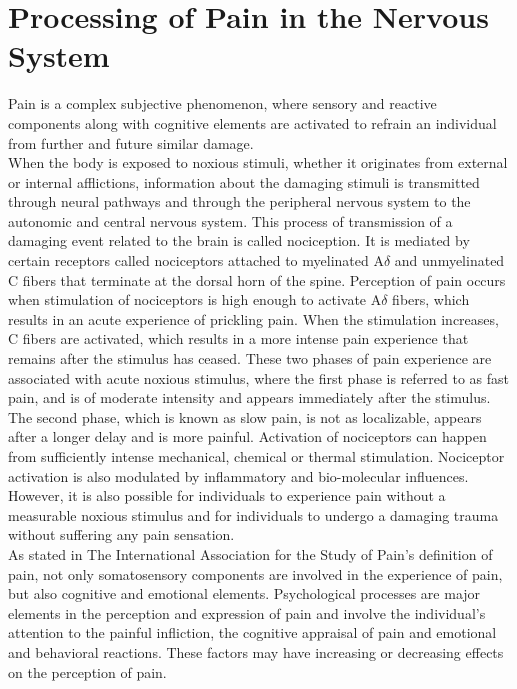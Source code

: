 \section{Processing of Pain in the Nervous System}

Pain is a complex subjective phenomenon, where sensory and reactive components along with cognitive elements are activated to refrain an individual from further and future similar damage. \\
When the body is exposed to noxious stimuli, whether it originates from external or internal afflictions, information about the damaging stimuli is transmitted through neural pathways and through the peripheral nervous system to the autonomic and central nervous system. This process of transmission of a damaging event related to the brain is called nociception. It is mediated by certain receptors called nociceptors attached to myelinated A$\delta$ and unmyelinated C fibers that terminate at the dorsal horn of the spine. Perception of pain occurs when stimulation of nociceptors is high enough to activate A$\delta$ fibers, which results in an acute experience of prickling pain. When the stimulation increases, C fibers are activated, which results in a more intense pain experience that remains after the stimulus has ceased. These two phases of pain experience are associated with acute noxious stimulus, where the first phase is referred to as fast pain, and is of moderate intensity and appears immediately after the stimulus. The second phase, which is known as slow pain, is not as localizable, appears after a longer delay and is more painful. Activation of nociceptors can happen from sufficiently intense mechanical, chemical or thermal stimulation. Nociceptor activation is also modulated by inflammatory and bio-molecular influences. However, it is also possible for individuals to experience pain without a measurable noxious stimulus and for individuals to undergo a damaging trauma without suffering any pain sensation. \cite{Garland2013} \\ 
As stated in The International Association for the Study of Pain’s definition of pain, not only somatosensory components are involved in the experience of pain, but also cognitive and emotional elements. Psychological processes are major elements in the perception and expression of pain and involve the individual’s attention to the painful infliction, the cognitive appraisal of pain and emotional and behavioral reactions. These factors may have increasing or decreasing effects on the perception of pain. \\
